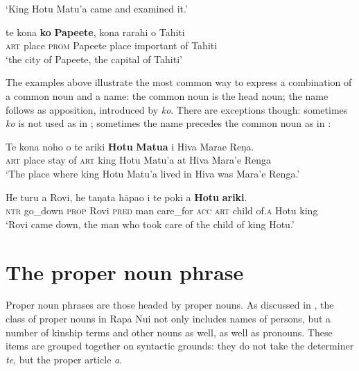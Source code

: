 \glt 
‘King Hotu Matu’a came and examined it.’ \textstyleExampleref{[Mtx-2-02.043]}
\z

\ea\label{ex:5.175}
\gll te kona \textbf{ko} \textbf{Pape{\ꞌ}ete}, kona rarahi o Tahiti \\
\textsc{art} place \textsc{prom} Papeete place important of Tahiti \\

\glt
‘the city of Papeete, the capital of Tahiti’ \textstyleExampleref{[R231.045]} 
\z

The examples above illustrate the most common way to express a combination of a common noun and a name: the common noun is the head noun; the name follows as apposition, introduced by \textit{ko}. There are exceptions though: sometimes \textit{ko} is not used as in ; sometimes the name precedes the common noun as in : 

\ea\label{ex:5.176}
\gll Te kona noho o te {\ꞌ}ariki \textbf{Hotu} \textbf{Matu{\ꞌ}a} {\ꞌ}i Hiva Mara{\ꞌ}e Reŋa. \\
\textsc{art} place stay of \textsc{art} king Hotu Matu’a at Hiva Mara’e Renga \\

\glt 
‘The place where king Hotu Matu’a lived in Hiva was Mara’e Renga.’ \textstyleExampleref{[Ley-2-01.002]}
\z

\ea\label{ex:5.177}
\gll He turu a Rovi, he taŋata hāpa{\ꞌ}o i te poki {\ꞌ}a \textbf{Hotu} \textbf{{\ꞌ}ariki}. \\
\textsc{ntr} go\_down \textsc{prop} Rovi \textsc{pred} man care\_for \textsc{acc} \textsc{art} child of\textsc{.a} Hotu king \\

\glt 
‘Rovi came down, the man who took care of the child of king Hotu.’ \textstyleExampleref{[R422.002]} 
\z
{}
\section{The proper noun phrase}\label{sec:5.13}
Proper noun phrases are those headed by proper nouns. As discussed in , the class of proper nouns in Rapa Nui not only includes names of persons, but a number of kinship terms and other nouns as well, as well as pronouns. These items are grouped together on syntactic grounds: they do not take the determiner \textit{te}, but the proper article \textit{a}. 

